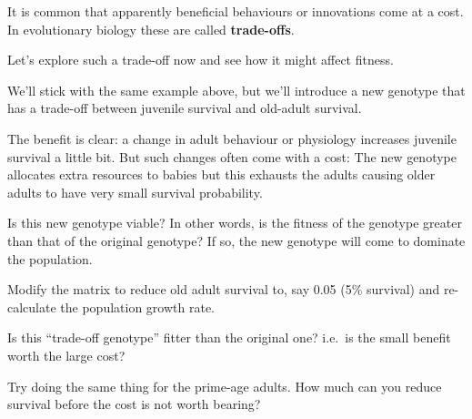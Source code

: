 \documentclass[
  a4paper]{book}
\begin{document}
It is common that apparently beneficial behaviours or innovations come at a cost. In evolutionary biology these are called \textbf{trade-offs}.

Let's explore such a trade-off now and see how it might affect fitness.

We'll stick with the same example above, but we'll introduce a new genotype that has a trade-off between juvenile survival and old-adult survival.

The benefit is clear: a change in adult behaviour or physiology increases juvenile survival a little bit.
But such changes often come with a cost: The new genotype allocates extra resources to babies but this exhausts the adults causing older adults to have very small survival probability.

Is this new genotype viable? In other words, is the fitness of the genotype greater than that of the original genotype? If so, the new genotype will come to dominate the population.

\begin{do-something}
Modify the matrix to reduce old adult survival to, say 0.05 (5\%
survival) and re-calculate the population growth rate.

Is this ``trade-off genotype'' fitter than the original one? i.e.~is the
small benefit worth the large cost?

Try doing the same thing for the prime-age adults. How much can you
reduce survival before the cost is not worth bearing?
\end{do-something}

  
\end{document}

